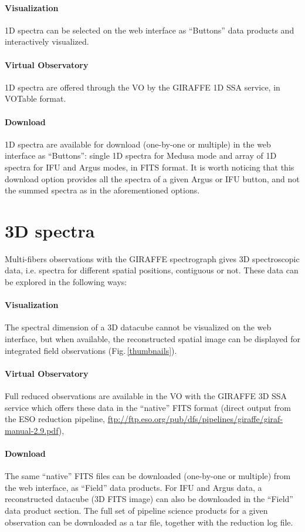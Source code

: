 \paragraph{Visualization} 1D spectra can be selected on the web interface as ``Buttons'' data products and interactively visualized.
\paragraph{Virtual Observatory} 1D spectra are offered through the VO by the GIRAFFE 1D SSA service, in VOTable format.
\paragraph{Download} 1D spectra are available for download (one-by-one or multiple) in the web interface as ``Buttons'': single 1D spectra for Medusa mode and array of 1D spectra for IFU and Argus modes, in FITS format. It is worth noticing that this download option provides all the spectra of a given Argus or IFU button, and not the summed spectra as in the aforementioned options. 

\section{3D spectra}

Multi-fibers observations with the GIRAFFE spectrograph gives 3D spectroscopic data, i.e. spectra for different spatial positions, contiguous or not. These data can be explored in the following ways:
\paragraph{Visualization} The spectral dimension of a 3D datacube cannot be visualized on the web interface, but when available, the reconstructed spatial image can be displayed for integrated field observations (Fig.\,\ref{thumbnails}).
\paragraph{Virtual Observatory} Full reduced observations are available in the VO with the GIRAFFE 3D SSA service which offers these data in the ``native'' FITS format (direct output from the ESO reduction pipeline, \url{ftp://ftp.eso.org/pub/dfs/pipelines/giraffe/giraf-manual-2.9.pdf}),
\paragraph{Download} The same ``native'' FITS files can be downloaded (one-by-one or multiple) from the web interface, as ``Field'' data products. For IFU and Argus data, a reconstructed datacube (3D FITS image) can also be downloaded in the ``Field''  data product section. The full set of pipeline science products for a given observation can be downloaded as a tar file, together with the reduction log file. 

